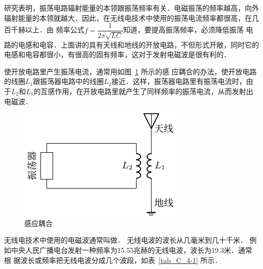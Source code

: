 研究表明，振荡电路辐射能量的本领跟振荡频率有关．电磁振荡的频率越高，向外辐射能量的本领就越大．因此，在无线电技术中使用的振荡电流频率都很高，在几百千赫以上．由
频率公式$f=\dfrac{1}{2\pi\sqrt{LC}}$知道，要提高振荡频率，必须降低振荡
电路的电感和电容．上面讲的具有天线和地线的开放电路，不但形式开敞，同时它的电感和电容都很小，有很高的固有频率，这对于发射电磁波是很有利的．


使开放电路里产生振荡电流，通常用如图~\ref{fig_C_4-12} 所示的感
应耦合的办法，使开放电路的线圈$L_1$跟振荡器电路中的线圈$L_2$接近．这样，振荡器电路里有振荡电流时，由于$L_2$和$L_1$的互感作用，在开放电路里就产生了同样频率的振荡电流，从而发射出电磁波．
\begin{figure}[htbp]
	\centering
	\includegraphics{fig/C/4-12.pdf}
	\caption{感应耦合}\label{fig_C_4-12}
\end{figure}



无线电技术中使用的电磁波通常叫做．
无线电波的波长从几毫米到几十千米．
例如中央人民广播电台发射一种频率为15.55兆赫的无线电波，波长为19.3米．通常根
据波长或频率把无线电波分成几个波段，如表~\ref{tab_C_4-1} 所示．


